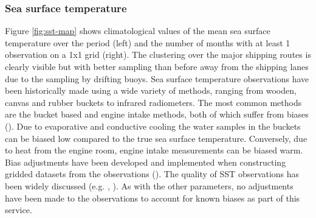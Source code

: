 \subsubsection{Sea surface temperature}
Figure \ref{fig:sst-map} shows climatological values of the mean sea surface temperature over the period \datatimerange{} (left) and the number of months with at least 1 observation on a 1x1 grid (right).
The clustering over the major shipping routes is clearly visible but with better sampling than before away from the shipping lanes due to the sampling by drifting buoys.
Sea surface temperature observations have been historically made using a wide variety of methods, ranging from wooden, canvas and rubber buckets to infrared radiometers. 
The most common methods are the bucket based and engine intake methods, both of which suffer from biases (\cite{Kent2017}). 
Due to evaporative and conductive cooling the water samples in the buckets can be biased low compared to the true sea surface temperature. 
Conversely, due to heat from the engine room, engine intake measurements can be biased warm. 
Bias adjustments have been developed and implemented when constructing gridded datasets from the observations (\cite{Kennedy2011_part2}). 
The quality of SST observations has been widely discussed (e.g. \cite{Kennedy2014}, \cite{Kent2017}).
As with the other parameters, no adjustments have been made to the observations to account for known biases as part of this service.

